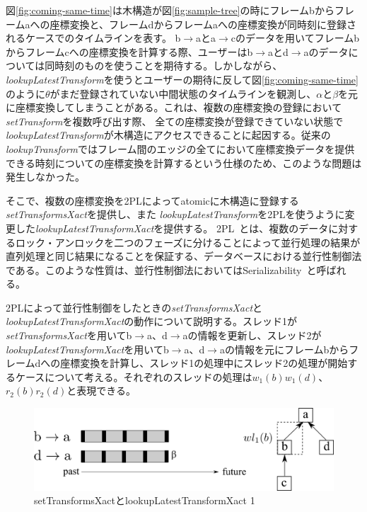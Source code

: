 \documentclass[a4paper]{jreport}	%
\begin{document}
図\ref{fig:coming-same-time}は木構造が図\ref{fig:sample-tree}の時にフレームbからフレームaへの座標変換と、フレームdからフレームaへの座標変換が同時刻に登録されるケースでのタイムラインを表す。
b$\rightarrow$aとa$\rightarrow$cのデータを用いてフレームbからフレームcへの座標変換を計算する際、ユーザーはb$\rightarrow$aとd$\rightarrow$aのデータについては同時刻のものを使うことを期待する。しかしながら、\textit{lookupLatestTransform}を使うとユーザーの期待に反して図\ref{fig:coming-same-time}のように$\theta$がまだ登録されていない中間状態のタイムラインを観測し、$\alpha$と$\beta$を元に座標変換してしまうことがある。これは、複数の座標変換の登録において\textit{setTransform}を複数呼び出す際、 全ての座標変換が登録できていない状態で\textit{lookupLatestTransform}が木構造にアクセスできることに起因する。従来の\textit{lookupTransform}ではフレーム間のエッジの全てにおいて座標変換データを提供できる時刻についての座標変換を計算するという仕様のため、このような問題は発生しなかった。


そこで、複数の座標変換を2PLによってatomicに木構造に登録する\textit{setTransformsXact}を提供し、また
\textit{lookupLatestTransform}を2PLを使うように変更した\textit{lookupLatestTransformXact}を提供する。
2PL~\cite{2PL}とは、複数のデータに対するロック・アンロックを二つのフェーズに分けることによって並行処理の結果が直列処理と同じ結果になることを保証する、データベースにおける並行性制御法である。このような性質は、並行性制御法においてはSerializability~\cite{2PL}と呼ばれる。

2PLによって並行性制御をしたときの\textit{setTransformsXact}と\textit{lookupLatestTransformXact}の動作について説明する。スレッド1が\textit{setTransformsXact}を用いてb$\rightarrow$a、d$\rightarrow$aの情報を更新し、スレッド2が\textit{lookupLatestTransformXact}を用いてb$\rightarrow$a、d$\rightarrow$aの情報を元にフレームbからフレームdへの座標変換を計算し、スレッド1の処理中にスレッド2の処理が開始するケースについて考える。それぞれのスレッドの処理は$w_1(b)w_1(d)$、$r_2(b)r_2(d)$と表現できる。

\begin{figure}[h] 
\centering
\includegraphics[width=12cm]{setTransforms1}
\caption{setTransformsXactとlookupLatestTransformXact 1}
\label{fig:setTransforms1}
\end{figure}
\end{document}
